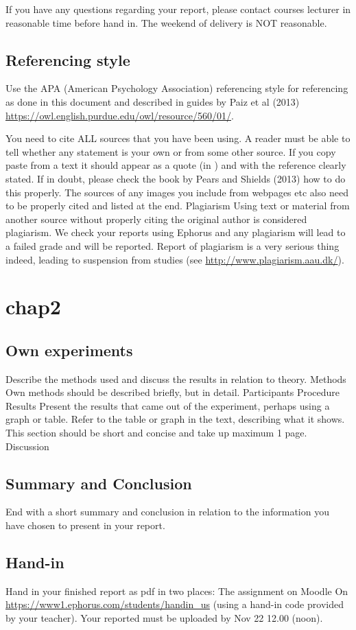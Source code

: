 If you have any questions regarding your report, please contact courses lecturer in reasonable time before hand in. The weekend of delivery is NOT reasonable.

\section{Referencing style}
Use the APA (American Psychology Association) referencing style for referencing as done in this document and described in guides by Paiz et al (2013) \url{https://owl.english.purdue.edu/owl/resource/560/01/}.

You need to cite ALL sources that you have been using. A reader must be able to tell whether any statement is your own or from some other source. If you copy paste from a text it should appear as a quote (in ) and with the reference clearly stated. If in doubt, please check the book by Pears and Shields (2013) how to do this properly. The sources of any images you include from webpages etc also need to be properly cited and listed at the end.  
Plagiarism
Using text or material from another source without properly citing the original author is considered plagiarism. We check your reports using Ephorus and any plagiarism will lead to a failed grade and will be reported. Report of plagiarism is a very serious thing indeed, leading to suspension from studies (see \url{http://www.plagiarism.aau.dk/}).

\chapter{chap2}
\section{Own experiments}
Describe the methods used and discuss the results in relation to theory. 
Methods
Own methods should be described briefly, but in detail.
Participants
Procedure
Results
Present the results that came out of the experiment, perhaps using a graph or table. Refer to the table or graph in the text, describing what it shows. This section should be short and concise and take up maximum 1 page.
Discussion
\section{Summary and Conclusion}
End with a short summary and conclusion in relation to the information you have chosen to present in your report.

\section{Hand-in}
Hand in your finished report as pdf in two places:
The assignment on Moodle
On \url{https://www1.ephorus.com/students/handin_us}  (using a hand-in code provided by your teacher).
Your reported must be uploaded by Nov 22 12.00 (noon).

